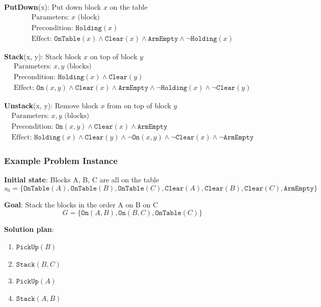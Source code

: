 \documentclass[11pt,a4paper]{article}
\theoremstyle{definition}
\theoremstyle{plain}
\theoremstyle{remark}
\begin{document}
\textbf{PutDown}(x): Put down block $x$ on the table
\[
\begin{array}{l}
\text{Parameters: } x \text{ (block)} \\
\text{Precondition: } \texttt{Holding}(x) \\
\text{Effect: } \texttt{OnTable}(x) \land \texttt{Clear}(x) \land \texttt{ArmEmpty} \land \neg \texttt{Holding}(x)
\end{array}
\]

\textbf{Stack}(x, y): Stack block $x$ on top of block $y$
\[
\begin{array}{l}
\text{Parameters: } x, y \text{ (blocks)} \\
\text{Precondition: } \texttt{Holding}(x) \land \texttt{Clear}(y) \\
\text{Effect: } \texttt{On}(x, y) \land \texttt{Clear}(x) \land \texttt{ArmEmpty} \land \neg \texttt{Holding}(x) \land \neg \texttt{Clear}(y)
\end{array}
\]

\textbf{Unstack}(x, y): Remove block $x$ from on top of block $y$
\[
\begin{array}{l}
\text{Parameters: } x, y \text{ (blocks)} \\
\text{Precondition: } \texttt{On}(x, y) \land \texttt{Clear}(x) \land \texttt{ArmEmpty} \\
\text{Effect: } \texttt{Holding}(x) \land \texttt{Clear}(y) \land \neg \texttt{On}(x, y) \land \neg \texttt{Clear}(x) \land \neg \texttt{ArmEmpty}
\end{array}
\]

\subsubsection{Example Problem Instance}

\textbf{Initial state}: Blocks A, B, C are all on the table
\[
s_0 = \{\texttt{OnTable}(A), \texttt{OnTable}(B), \texttt{OnTable}(C), \texttt{Clear}(A), \texttt{Clear}(B), \texttt{Clear}(C), \texttt{ArmEmpty}\}
\]

\textbf{Goal}: Stack the blocks in the order A on B on C
\[
G = \{\texttt{On}(A, B), \texttt{On}(B, C), \texttt{OnTable}(C)\}
\]

\textbf{Solution plan}:
\begin{enumerate}
    \item $\texttt{PickUp}(B)$
    \item $\texttt{Stack}(B, C)$
    \item $\texttt{PickUp}(A)$
    \item $\texttt{Stack}(A, B)$
\end{enumerate}
\end{document}

